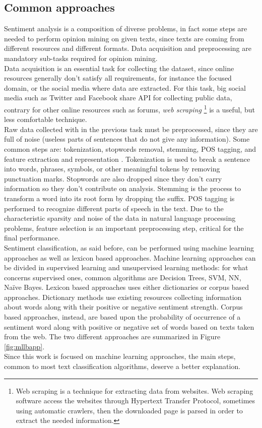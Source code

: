 \subsection{Common approaches}

Sentiment analysis is a composition of diverse problems, in fact some steps are needed to perform opinion mining on given texts, since texts are coming from different resources and different formats. Data acquisition and preprocessing are mandatory sub-tasks required for opinion mining.\\
Data acquisition is an essential task for collecting the dataset, since online resources generally don't satisfy all requirements, for instance the focused domain, or the social media where data are extracted. For this task, big social media such as Twitter and Facebook share \ac{API} for collecting public data, contrary for other online resources such as forums, \textit{web scraping} \footnote{Web scraping is a technique for extracting data from websites. Web scraping software access the websites through Hypertext Transfer Protocol, sometimes using automatic crawlers, then the downloaded page is parsed in order to extract the needed information.} is a useful, but less comfortable technique.\\
Raw data collected with in the previous task must be preprocessed, since they are full of noise (useless parts of sentences that do not give any information). Some common steps are: tokenization, stopwords removal, stemming, \ac{POS} tagging, and feature extraction and
representation \cite{RAVI201514}. Tokenization is used to break a sentence into words, phrases, symbols, or other meaningful tokens by removing punctuation marks. Stopwords are also dropped since they don't carry information so they don't contribute on analysis. Stemming is the process to transform a word into its root form by dropping the suffix. \ac{POS} tagging is performed to recognize different parts of speech in the text. Due to the characteristic sparsity and noise of the data in natural language processing problems, feature selection is an important preprocessing step, critical for the final performance.\\
Sentiment classification, as said before, can be performed using machine learning approaches as well as lexicon based approaches. Machine learning approaches can be divided in supervised learning and unsupervised learning methods: for what concerns supervised ones, common algorithms are Decision Trees, \ac{SVM}, \ac{NN}, Na{\"i}ve Bayes. Lexicon based approaches uses either dictionaries or corpus based approaches. Dictionary methods use existing resources collecting information about words along with their positive or negative sentiment strength. Corpus based approaches, instead, are based upon the probability of occurrence of a sentiment word along with positive or negative set of words based on texts taken from the web. The two different approaches are summarized in Figure \ref{fig:mllbapp}.\\
Since this work is focused on machine learning approaches, the main steps, common to most text classification algorithms, deserve a better explanation.


